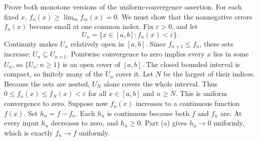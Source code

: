 \goal Prove both monotone versions of the uniform-convergence assertion.
For each fixed $x$, $f_n(x)\ge\lim_m f_m(x)=0$.
We must show that the nonnegative errors $f_n(x)$ become small at one common index.
Fix $\varepsilon>0$, and let
\[
 U_n=\{x\in[a,b]:f_n(x)<\varepsilon\}.
\]
Continuity makes $U_n$ relatively open in $[a,b]$.
Since $f_{n+1}\le f_n$, these sets increase: $U_n\subseteq U_{n+1}$.
Pointwise convergence to zero implies every $x$ lies in some $U_n$, so
$\{U_n:n\ge1\}$ is an open cover of $[a,b]$.
The closed bounded interval is compact, so finitely many of the $U_n$ cover it.
Let $N$ be the largest of their indices. Because the sets are nested,
$U_N$ alone covers the whole interval. Thus
$0\le f_n(x)\le f_N(x)<\varepsilon$ for all $x\in[a,b]$ and $n\ge N$.
This is uniform convergence to zero.
Suppose now $f_n(x)$ increases to a continuous function $f(x)$.
Set $h_n=f-f_n$. Each $h_n$ is continuous because both $f$ and $f_n$ are.
At every input $h_n$ decreases to zero, and $h_n\ge0$.
Part (a) gives $h_n\to0$ uniformly, which is exactly $f_n\to f$ uniformly.
